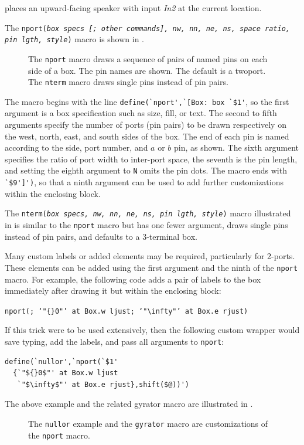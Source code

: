 \noindent
places an upward-facing speaker with input {\sl In2} at the
current location.

The {\tt nport({\sl box specs {\tt[;} other commands{\tt]},
  nw, nn, ne, ns, space ratio, pin lgth, style})}
macro is shown in .
\begin{figure}[H]
   
   \caption{The {\tt nport} macro draws a sequence of pairs of named pins
     on each side of a box.  The pin names are shown.  The default is a twoport.
     The {\tt nterm} macro draws single pins instead of pin pairs.}
   \label{Nport}
   \end{figure}
The macro begins with the line
 \verb|define(`nport',`[Box: box `$1'|,
so the first argument is a box specification such as size, fill,
or text.
The second to fifth arguments specify the number of ports
(pin pairs) to be drawn respectively on the west, north, east, and south
sides of the box.  The end of each pin is named according to the
side, port number, and $a$ or $b$ pin, as shown.
The sixth argument
specifies the ratio of port width to inter-port space, the seventh is
the pin length, and setting the eighth argument to {\tt N} omits the pin
dots.
The macro ends with \verb|`$9']')|, so that a ninth argument can be used
to add further customizations within the enclosing block.

The {\tt nterm({\sl box specs, nw, nn, ne, ns, pin lgth, style})} macro
illustrated in  is similar to the {\tt nport} macro but
has one fewer argument, draws single pins instead of pin pairs, and
defaults to a 3-terminal box.

Many custom labels or added elements may be required, particularly for
2-ports\label{Nports:}. These elements can be added using the first
argument and the ninth of the {\tt nport} macro.
For example, the following code adds a pair of labels to the box
immediately after drawing it but within the enclosing block:

{\tt nport(; {`"${}0$"'\ at Box.w ljust; `"$\infty$"'\ at
 Box.e rjust})}

If this trick were to be used extensively, then the following custom wrapper
would save typing, add the labels, and pass all arguments to
{\tt nport}:

\begin{verbatim}
define(`nullor',`nport(`$1'
  {`"${}0$"' at Box.w ljust
   `"$\infty$"' at Box.e rjust},shift($@))')
\end{verbatim}

The above example and the related gyrator macro are illustrated in
.
\begin{figure}[H]
   
   \caption{The {\tt nullor} example and the {\tt gyrator}
    macro are customizations of the {\tt nport} macro.}
   \label{NLG}
   \end{figure}

